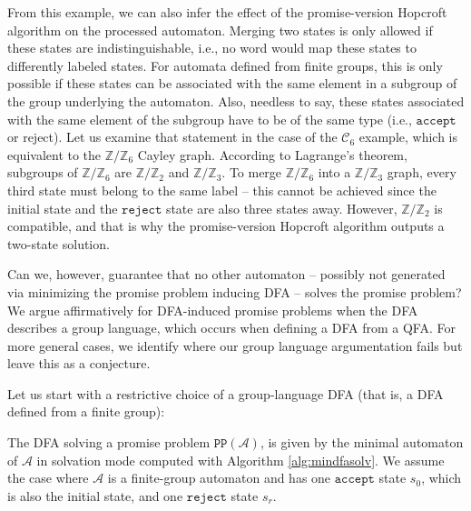 \documentclass[../main.tex]{subfiles}
\begin{document}
From this example, we can also infer the effect of the promise-version Hopcroft algorithm on the processed automaton. Merging two states is only allowed if these states are indistinguishable, i.e., no word would map these states to differently labeled states. For automata defined from finite groups, this is only possible if these states can be associated with the same element in a subgroup of the group underlying the automaton. Also, needless to say, these states associated with the same element of the subgroup have to be of the same type (i.e., $\mathtt{accept}$ or reject). Let us examine that statement in the case of the $\mathcal{C}_6$ example, which is equivalent to the $\mathbb{Z}/\mathbb{Z}_6$ Cayley graph. According to Lagrange's theorem, subgroups of $\mathbb{Z}/\mathbb{Z}_6$ are $\mathbb{Z}/\mathbb{Z}_2$ and $\mathbb{Z}/\mathbb{Z}_3$. To merge $\mathbb{Z}/\mathbb{Z}_6$ into a $\mathbb{Z}/\mathbb{Z}_3$ graph, every third state must belong to the same label -- this cannot be achieved since the initial state and the $\mathtt{reject}$  state are also three states away. However, $\mathbb{Z}/\mathbb{Z}_2$ is compatible, and that is why the promise-version Hopcroft algorithm outputs a two-state solution.

Can we, however, guarantee that no other automaton -- possibly not generated via minimizing the promise problem inducing \ac{DFA} -- solves the promise problem? We argue affirmatively for DFA-induced promise problems when the DFA describes a group language, which occurs when defining a DFA from a QFA. For more general cases, we identify where our group language argumentation fails but leave this as a conjecture.

Let us start with a restrictive choice of a group-language DFA (that is, a DFA defined from a finite group):
\begin{proposition}\label{prop:minsolvation}
    The DFA solving a promise problem $\mathtt{PP}(\mathcal{A})$, is given by the minimal automaton of $\mathcal{A}$ in solvation mode computed with Algorithm \ref{alg:mindfasolv}. We assume the case where $\mathcal{A}$ is a finite-group automaton and has one $\mathtt{accept}$ state $s_0$, which is also the initial state, and one $\mathtt{reject}$  state $s_r$.
\end{proposition}
\end{document}
